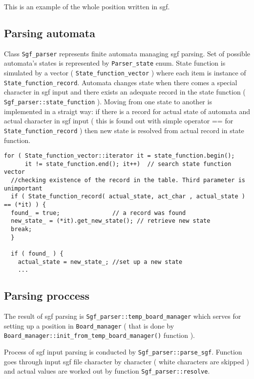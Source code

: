 This is an example of the whole position written in sgf.\subsection{Parsing automata}\label{page_5_page_5__sec_2}
Class {\tt Sgf\_\-parser} represents finite automata managing sgf parsing. Set of possible automata's states is represented by {\tt Parser\_\-state} enum. State function is simulated by a vector ( {\tt State\_\-function\_\-vector} ) where each item is instance of {\tt State\_\-function\_\-record}. Automata changes state when there comes a special character in sgf input and there exists an adequate record in the state function ( {\tt Sgf\_\-parser::state\_\-function} ). Moving from one state to another is implemented in a straigt way: if there is a record for actual state of automata and actual character in sgf input ( this is found out with simple operator == for {\tt State\_\-function\_\-record} ) then new state is resolved from actual record in state function.

\label{page_5_page_5__resolving_new_state}
 

\footnotesize\begin{verbatim}for ( State_function_vector::iterator it = state_function.begin(); 
      it != state_function.end(); it++)  // search state function vector
  //checking existence of the record in the table. Third parameter is unimportant 
  if ( State_function_record( actual_state, act_char , actual_state ) == (*it) ) { 
  found_ = true;               // a record was found 
  new_state_ = (*it).get_new_state(); // retrieve new state 
  break; 
  }

  if ( found_ ) {
    actual_state = new_state_; //set up a new state
    ...
\end{verbatim}
\normalsize
\subsection{Parsing proccess}\label{page_5_page_5__sec_3}
The result of sgf parsing is {\tt Sgf\_\-parser::temp\_\-board\_\-manager} which serves for setting up a position in {\tt Board\_\-manager} ( that is done by {\tt Board\_\-manager::init\_\-from\_\-temp\_\-board\_\-manager()} function ).

Process of sgf input parsing is conducted by {\tt Sgf\_\-parser::parse\_\-sgf}. Function goes through input sgf file character by character ( white characters are skipped ) and actual values are worked out by function {\tt Sgf\_\-parser::resolve}.



